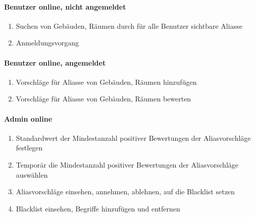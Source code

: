 \paragraph{Benutzer online, nicht angemeldet}
\begin{enumerate}[label=\textbf{/T\arabic*0/}, align=left]
	\item Suchen von Gebäuden, Räumen durch für alle Benutzer sichtbare Aliasse
	\item Anmeldungsvorgang
\end{enumerate}

\paragraph{Benutzer online, angemeldet}
\begin{enumerate}[label=\textbf{/T\arabic*0/}, align=left]
	\item Vorschläge für Aliasse von Gebäuden, Räumen hinzufügen
	\item Vorschläge für Aliasse von Gebäuden, Räumen bewerten
\end{enumerate}

\paragraph{Admin online}
\begin{enumerate}[label=\textbf{/T\arabic*0/}, align=left]
	\item Standardwert der Mindestanzahl positiver Bewertungen der Aliasvorschläge festlegen
	\item Temporär die Mindestanzahl positiver Bewertungen der Aliasvorschläge auswählen
	\item Aliasvorschläge einsehen, annehmen, ablehnen, auf die Blacklist setzen
	\item Blacklist einsehen, Begriffe hinzufügen und entfernen
\end{enumerate}
